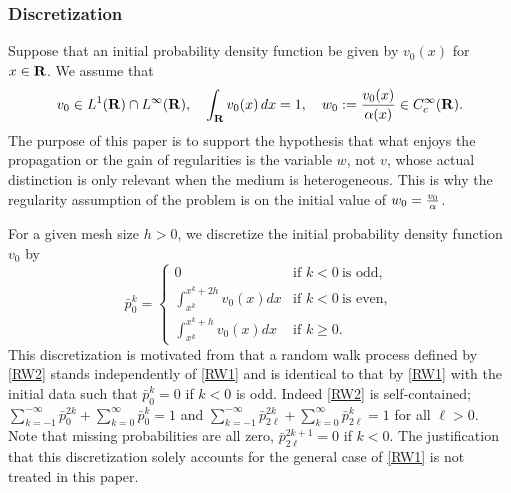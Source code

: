 \documentclass[11pt]{amsart}
\def\R{{\bf R}}
\def\R{\mathbb{R}}
\def\R{{\bf R}}
\begin{document}
% 


\subsubsection{Discretization}

Suppose that an initial probability density function be given by $v_0(x)$ for $x\in\R$. We assume that
\begin{equation} \label{initial}
 v_0 \in L^1( \R)\cap L^\infty(\R), \quad \int_ \R v_0(x)\, dx = 1, \quad
 w_0:=\frac{v_0(x)}{\alpha(x)} \in C^\infty_c(\R).
\end{equation}
The purpose of this paper is to support the hypothesis that what enjoys the propagation or the gain of regularities is the variable $w$, not $v$, whose actual distinction is only relevant when the medium is heterogeneous. This is why the regularity assumption of the problem is on the initial value of $w_0={v_0\over\alpha}$.

For a given mesh size $h>0$, we discretize the initial probability density function $v_0$ by
\begin{equation}\label{p0k}
\bar{p}_{0}^{k} = \left\{\begin{array}{ll}
               0 & \text{if } k<0\ \text{is odd},\\
               \int_{x^k}^{x^{k}+2h} v_0(x)dx & \text{if } k<0\ \text{is
               even},\\
                \int_{x^k}^{x^{k}+h} v_0(x)dx  & \text{if } k\ge0.
               \end{array}\right.
\end{equation}
This discretization is motivated from that a random walk process defined by \eqref{RW2} stands independently of \eqref{RW1} and is identical to that by \eqref{RW1} with the initial data such that $\bar{p}^k_0=0$ if $k<0$ is odd. Indeed \eqref{RW2} is self-contained; $\sum_{k=-1}^{-\infty}\bar{p}_{0}^{2k}+\sum_{k=0}^{\infty}\bar{p}_{0}^{k}= 1$ and $\sum_{k=-1}^{-\infty}\bar{p}_{2\ell}^{2k}+\sum_{k=0}^{\infty}\bar{p}_{2\ell}^{k}=1$ for all $\ell>0$. Note that missing probabilities are all zero, $\bar{p}_{2\ell}^{2k+1}=0$ if $k<0$. The justification that this discretization solely  accounts for the general case of \eqref{RW1} is not treated in this paper. 
\end{document}
